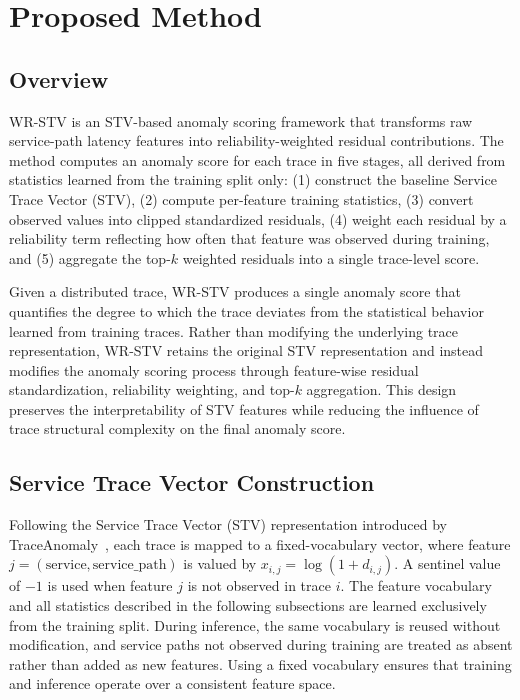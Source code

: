 \section{Proposed Method}
\label{sec:methodology}

\subsection{Overview}

WR-STV is an STV-based anomaly scoring framework that transforms raw
service-path latency features into reliability-weighted residual
contributions. The method computes an anomaly score for each trace in
five stages, all derived from statistics learned from the training split
only: (1) construct the baseline Service Trace Vector (STV), (2) compute
per-feature training statistics, (3) convert observed values into
clipped standardized residuals, (4) weight each residual by a reliability
term reflecting how often that feature was observed during training, and
(5) aggregate the top-\(k\) weighted residuals into a single trace-level
score. 

Given a distributed trace, WR-STV produces a single anomaly score that
quantifies the degree to which the trace deviates from the statistical
behavior learned from training traces. Rather than modifying the underlying trace representation, WR-STV retains the original STV representation and instead modifies the anomaly scoring
process through feature-wise residual standardization, reliability
weighting, and top-\(k\) aggregation. This design preserves the interpretability of STV
features while reducing the influence of trace structural complexity on
the final anomaly score.


\subsection{Service Trace Vector Construction}

Following the Service Trace Vector (STV) representation introduced by
TraceAnomaly~\cite{liu2020traceanomaly}, each trace is mapped to a
fixed-vocabulary vector, where feature
\(j=(\text{service},\text{service\_path})\) is valued by
\(x_{i,j}=\log(1+d_{i,j})\). A sentinel value of \(-1\) is used when
feature \(j\) is not observed in trace \(i\). The feature vocabulary and
all statistics described in the following subsections are learned
exclusively from the training split. During inference, the same
vocabulary is reused without modification, and service paths not observed
during training are treated as absent rather than added as new features.
Using a fixed vocabulary ensures that training and inference operate over
a consistent feature space.


